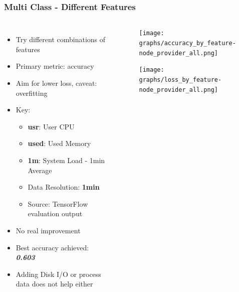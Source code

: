 \documentclass[aspectratio=169,11pt,hyperref={colorlinks=true}]{beamer}
\begin{document}
\begin{frame}
    \frametitle{Multi Class - Different Features}
    \begin{columns}
        \begin{itemize}
            \item{Try different combinations of features}
            \item{Primary metric: accuracy}
            \item{Aim for lower loss, caveat: overfitting}
            \item{Key:}
            \begin{itemize}
              \item{\textbf{usr}: User CPU}
              \item{\textbf{used}: Used Memory}
              \item{\textbf{1m}: System Load - 1min Average}
              \item{Data Resolution: \textbf{1min}}
              \item{Source: TensorFlow evaluation output}
            \end{itemize}
            \item{No real improvement}
            \item{Best accuracy achieved: \emph{\textbf{0.603}}}
            \item{Adding Disk I/O or process data does not help either}
        \end{itemize}
        \begin{center}
        \begin{figure}
          \texttt{[image: graphs/accuracy\_by\_feature-node\_provider\_all.png]}
        \end{figure}
        \begin{figure}
          \texttt{[image: graphs/loss\_by\_feature-node\_provider\_all.png]}
        \end{figure}
      \end{center}
  \end{columns}
\end{frame}
%
\end{document}
